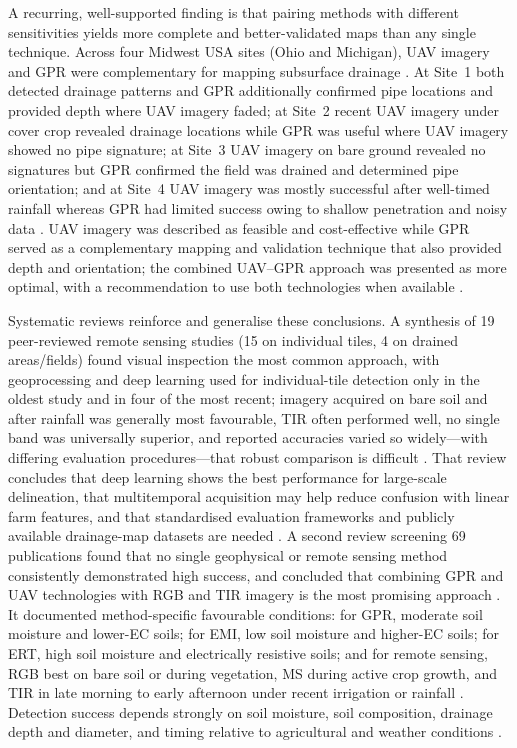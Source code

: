 \documentclass[11pt]{article}
\begin{document}
A recurring, well-supported finding is that pairing methods with different sensitivities yields more complete and better-validated maps than any single technique. Across four Midwest USA sites (Ohio and Michigan), UAV imagery and GPR were complementary for mapping subsurface drainage \parencite{Koganti2021}. At Site~1 both detected drainage patterns and GPR additionally confirmed pipe locations and provided depth where UAV imagery faded; at Site~2 recent UAV imagery under cover crop revealed drainage locations while GPR was useful where UAV imagery showed no pipe signature; at Site~3 UAV imagery on bare ground revealed no signatures but GPR confirmed the field was drained and determined pipe orientation; and at Site~4 UAV imagery was mostly successful after well-timed rainfall whereas GPR had limited success owing to shallow penetration and noisy data \parencite{Koganti2021}. UAV imagery was described as feasible and cost-effective while GPR served as a complementary mapping and validation technique that also provided depth and orientation; the combined UAV--GPR approach was presented as more optimal, with a recommendation to use both technologies when available \parencite{Koganti2021}.

Systematic reviews reinforce and generalise these conclusions. A synthesis of 19 peer-reviewed remote sensing studies (15 on individual tiles, 4 on drained areas/fields) found visual inspection the most common approach, with geoprocessing and deep learning used for individual-tile detection only in the oldest study and in four of the most recent; imagery acquired on bare soil and after rainfall was generally most favourable, TIR often performed well, no single band was universally superior, and reported accuracies varied so widely---with differing evaluation procedures---that robust comparison is difficult \parencite{Carlsen2024}. That review concludes that deep learning shows the best performance for large-scale delineation, that multitemporal acquisition may help reduce confusion with linear farm features, and that standardised evaluation frameworks and publicly available drainage-map datasets are needed \parencite{Carlsen2024}. A second review screening 69 publications found that no single geophysical or remote sensing method consistently demonstrated high success, and concluded that combining GPR and UAV technologies with RGB and TIR imagery is the most promising approach \parencite{Wienken2024}. It documented method-specific favourable conditions: for GPR, moderate soil moisture and lower-EC soils; for EMI, low soil moisture and higher-EC soils; for ERT, high soil moisture and electrically resistive soils; and for remote sensing, RGB best on bare soil or during vegetation, MS during active crop growth, and TIR in late morning to early afternoon under recent irrigation or rainfall \parencite{Wienken2024}. Detection success depends strongly on soil moisture, soil composition, drainage depth and diameter, and timing relative to agricultural and weather conditions \parencite{Wienken2024}.
\end{document}
